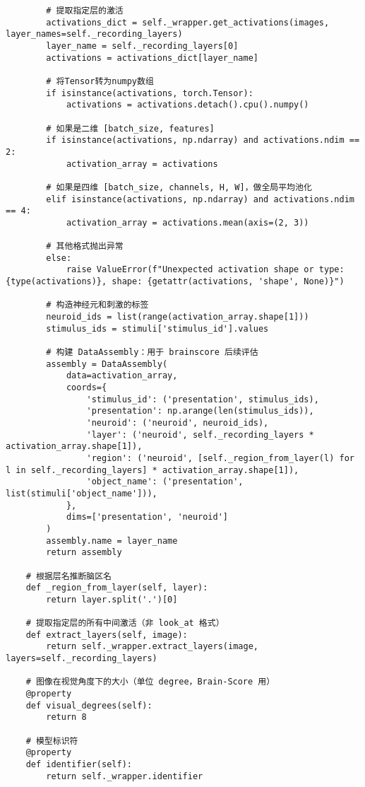 \begin{lstlisting}
        # 提取指定层的激活
        activations_dict = self._wrapper.get_activations(images, layer_names=self._recording_layers)
        layer_name = self._recording_layers[0]
        activations = activations_dict[layer_name]

        # 将Tensor转为numpy数组
        if isinstance(activations, torch.Tensor):
            activations = activations.detach().cpu().numpy()

        # 如果是二维 [batch_size, features]
        if isinstance(activations, np.ndarray) and activations.ndim == 2:
            activation_array = activations

        # 如果是四维 [batch_size, channels, H, W]，做全局平均池化
        elif isinstance(activations, np.ndarray) and activations.ndim == 4:
            activation_array = activations.mean(axis=(2, 3))

        # 其他格式抛出异常
        else:
            raise ValueError(f"Unexpected activation shape or type: {type(activations)}, shape: {getattr(activations, 'shape', None)}")

        # 构造神经元和刺激的标签
        neuroid_ids = list(range(activation_array.shape[1]))
        stimulus_ids = stimuli['stimulus_id'].values

        # 构建 DataAssembly：用于 brainscore 后续评估
        assembly = DataAssembly(
            data=activation_array,
            coords={
                'stimulus_id': ('presentation', stimulus_ids),
                'presentation': np.arange(len(stimulus_ids)),
                'neuroid': ('neuroid', neuroid_ids),
                'layer': ('neuroid', self._recording_layers * activation_array.shape[1]),
                'region': ('neuroid', [self._region_from_layer(l) for l in self._recording_layers] * activation_array.shape[1]),
                'object_name': ('presentation', list(stimuli['object_name'])),
            },
            dims=['presentation', 'neuroid']
        )
        assembly.name = layer_name
        return assembly

    # 根据层名推断脑区名
    def _region_from_layer(self, layer):
        return layer.split('.')[0]

    # 提取指定层的所有中间激活（非 look_at 格式）
    def extract_layers(self, image):
        return self._wrapper.extract_layers(image, layers=self._recording_layers)

    # 图像在视觉角度下的大小（单位 degree，Brain-Score 用）
    @property
    def visual_degrees(self):
        return 8

    # 模型标识符
    @property
    def identifier(self):
        return self._wrapper.identifier

\end{lstlisting}

